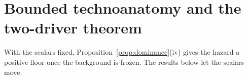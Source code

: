 \section{Bounded technoanatomy and the two-driver theorem}
\label{sec:trichotomy}

With the scalars fixed, Proposition~\ref{prop:dominance}(iv) gives the
hazard a positive floor once the background is frozen. The results below
let the scalars move.

